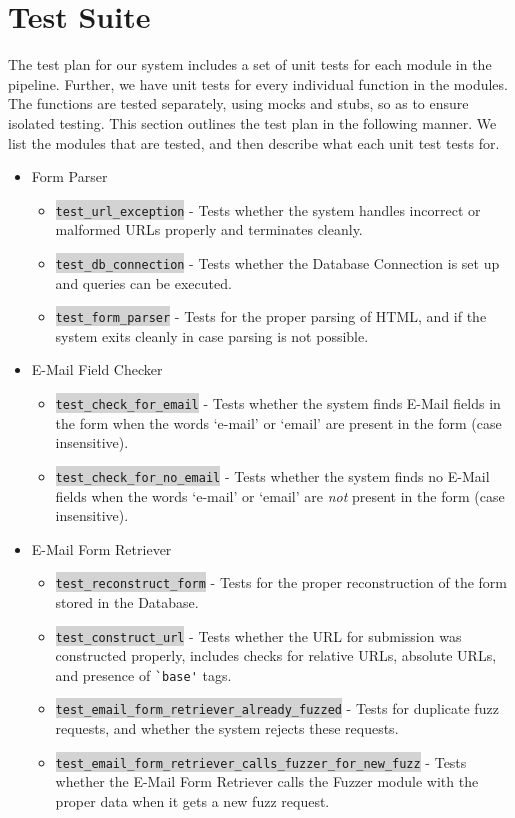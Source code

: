 \section{Test Suite}
\label{Arch:Test}
The test plan for our system includes a set of unit tests for each module in the pipeline. Further, we have unit tests for every %
individual function in the modules. The functions are tested separately, using mocks and stubs, so as to ensure isolated testing.
This section outlines the test plan in the following manner. We list the modules that are tested, and then describe what each unit test tests for.
\begin{itemize}
	\item Form Parser
	\begin{itemize}
		\item \colorbox{lightgray}{\lstinline{test_url_exception}} - Tests whether the system handles incorrect or malformed URLs properly and terminates cleanly.
		\item \colorbox{lightgray}{\lstinline{test_db_connection}} - Tests whether the Database Connection is set up and queries can be executed.
		\item \colorbox{lightgray}{\lstinline{test_form_parser}} - Tests for the proper parsing of HTML, and if the system exits cleanly in case parsing is not possible.
	\end{itemize}
	
	\item E-Mail Field Checker
	\begin{itemize}
		\item \colorbox{lightgray}{\lstinline{test_check_for_email}} - Tests whether the system finds E-Mail fields in the form when the words `e-mail' or `email' are present in the form (case insensitive).
		\item \colorbox{lightgray}{\lstinline{test_check_for_no_email}} - Tests whether the system finds no E-Mail fields when the words `e-mail' or `email' are \emph{not} present in the form (case insensitive).
	\end{itemize}
	
	\item E-Mail Form Retriever
	\begin{itemize}
		\item \colorbox{lightgray}{\lstinline{test_reconstruct_form}} - Tests for the proper reconstruction of the form stored in the Database.
		\item \colorbox{lightgray}{\lstinline{test_construct_url}} - Tests whether the URL for submission was constructed properly, includes checks for relative URLs, absolute URLs, and presence of \lstinline{`base'} tags.
		\item \colorbox{lightgray}{\lstinline{test_email_form_retriever_already_fuzzed}} - Tests for duplicate fuzz requests, and whether the system rejects these requests.
		\item \colorbox{lightgray}{\lstinline{test_email_form_retriever_calls_fuzzer_for_new_fuzz}} - Tests whether the E-Mail Form Retriever calls the Fuzzer module with the proper data when it gets a new fuzz request.
	\end{itemize}
	

\end{itemize}
